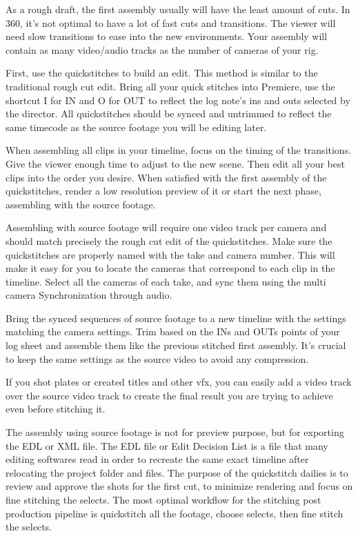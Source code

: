 \begin{fullwidth}
As a rough draft, the first assembly usually will have the least amount of cuts. In 360, it’s not optimal to have a lot of fast cuts and transitions. The viewer will need slow transitions to ease into the new environments. Your assembly will contain as many video/audio tracks as the number of cameras of your rig. 

First, use the quickstitches to build an edit. This method is similar to the traditional rough cut edit. Bring all your quick stitches into Premiere, use the shortcut I for IN and O for OUT to reflect the log note’s ins and outs selected by the director. All quickstitches should be synced and untrimmed to reflect the same timecode as the source footage you will be editing later.

When assembling all clips in your timeline, focus on the timing of the transitions. Give the viewer enough time to adjust to the new scene. Then edit all your best clips into the order you desire. 
When satisfied with the first assembly of the quickstitches, render a low resolution preview of it or start the next phase, assembling with the source footage.


Assembling with source footage will require one video track per camera and should match precisely the rough cut edit of the quickstitches. Make sure the quickstitches are properly named with the take and camera number. This will make it easy for you to locate the cameras that correspond to each clip in the timeline. Select all the cameras of each take, and sync them using the multi camera Synchronization through audio.

Bring the synced sequences of source footage to a new timeline with the settings matching the camera settings. Trim based on the INs and OUTs points of your log sheet and assemble them like the previous stitched first assembly. It’s crucial to keep the same settings as the source video to avoid any compression. 

If you shot plates or created titles and other vfx, you can easily add a video track over the source video track to create the final result you are trying to achieve even before stitching it.


The assembly using source footage is not for preview purpose, but for exporting the EDL or XML file. The EDL file or Edit Decision List is a file that many editing softwares read in order to recreate the same exact timeline after relocating the project folder and files. The purpose of the quickstitch dailies is to review and approve the shots for the first cut, to minimize rendering and focus on fine stitching the selects. The most optimal workflow for the stitching post production pipeline is quickstitch all the footage, choose selects, then fine stitch the selects.


\clearpage
\end{fullwidth}